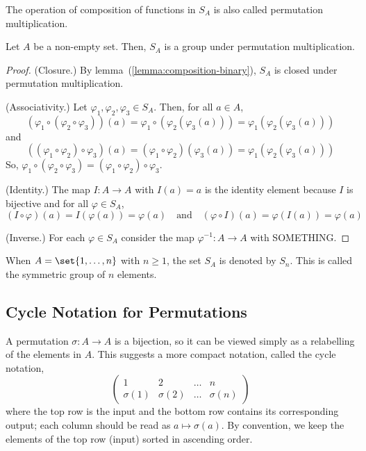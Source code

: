 \documentclass[11pt]{penrose}
\begin{document}
\begin{notation}
    The operation of composition of functions in $S_A$ is also called permutation multiplication.
\end{notation}

\begin{nthm}
    Let $A$ be a non-empty set. Then, $S_A$ is a group under permutation multiplication.
\end{nthm}
\begin{proof}
    (Closure.) By lemma~(\ref{lemma:composition-binary}), $S_A$ is closed under permutation multiplication.

    (Associativity.) Let $\varphi_1, \varphi_2, \varphi_3 \in S_A$. Then, for all $a \in A$,
    \begin{equation*}
        (\varphi_1 \circ (\varphi_2 \circ \varphi_3))(a)
        = \varphi_1 \circ ( \varphi_2(\varphi_3(a)) )
        = \varphi_1( \varphi_2(\varphi_3(a)) )
    \end{equation*}
    and
    \begin{equation*}
        ((\varphi_1 \circ \varphi_2) \circ \varphi_3)(a)
        = (\varphi_1 \circ \varphi_2)(\varphi_3(a))
        = \varphi_1( \varphi_2(\varphi_3(a)) )
    \end{equation*}
    So, $\varphi_1 \circ (\varphi_2 \circ \varphi_3) = (\varphi_1 \circ \varphi_2) \circ \varphi_3$.

    (Identity.) The map $I : A \to A$ with $I(a) = a$ is the identity element because $I$ is bijective and for all $\varphi \in S_A$,
    \begin{equation*}
        (I \circ \varphi)(a) = I(\varphi(a)) = \varphi(a)
        \quad\text{and}\quad
        (\varphi \circ I)(a) = \varphi(I(a)) = \varphi(a)
    \end{equation*}

    (Inverse.) For each $\varphi \in S_A$ consider the map $\varphi^{-1} : A \to A$ with SOMETHING.
\end{proof}

\begin{ndfn}
    When $A=\set{1,\dots,n}$ with $n \geq 1$, the set $S_A$ is denoted by $S_n$. This is called the symmetric group of $n$ elements.
\end{ndfn}

\subsection{Cycle Notation for Permutations}
A permutation $\sigma: A \to A$ is a bijection, so it can be viewed simply as a relabelling of the elements in $A$. This suggests a more compact notation, called the cycle notation,
\begin{equation*}
    \begin{pmatrix}
        1 & 2 & \dots & n \\ \sigma(1) & \sigma(2) & \dots & \sigma(n)
    \end{pmatrix}
\end{equation*}
where the top row is the input and the bottom row contains its corresponding output; each column should be read as $a \mapsto \sigma(a)$. By convention, we keep the elements of the top row (input) sorted in ascending order.
\end{document}
